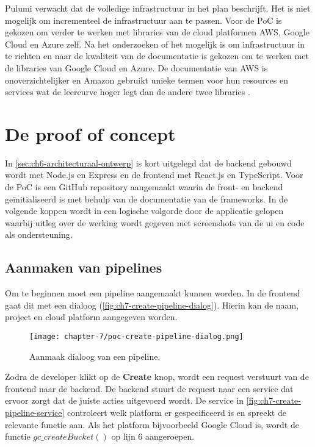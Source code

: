 Pulumi verwacht dat de volledige infrastructuur in het plan beschrijft. Het is niet mogelijk om incrementeel de infrastructuur aan te passen. Voor de PoC is gekozen om verder te werken met libraries van de cloud platformen AWS, Google Cloud en Azure zelf. Na het onderzoeken of het mogelijk is om infrastructuur in te richten en naar de kwaliteit van de documentatie is gekozen om te werken met de libraries van Google Cloud en Azure. De documentatie van AWS is onoverzichtelijker en Amazon gebruikt unieke termen voor hun resources en services wat de leercurve hoger legt dan de andere twee libraries \cite{aws-sdk-javascript-docs}.

\section{De proof of concept}\label{sec:ch7-de-proof-of-concept}
In \autoref{sec:ch6-architecturaal-ontwerp} is kort uitgelegd dat de backend gebouwd wordt met Node.js en Express en de frontend met React.js en TypeScript. Voor de PoC is een GitHub repository aangemaakt waarin de front- en backend geïnitialiseerd is met behulp van de documentatie van de frameworks. In de volgende koppen wordt in een logische volgorde door de applicatie gelopen waarbij uitleg over de werking wordt gegeven met screenshots van de \acrshort{ui} en code als ondersteuning.

\subsection{Aanmaken van pipelines}\label{subsec:ch7-aanmaken-van-pipelines}
Om te beginnen moet een pipeline aangemaakt kunnen worden. In de frontend gaat dit met een dialoog (\autoref{fig:ch7-create-pipeline-dialog}). Hierin kan de naam, project en cloud platform aangegeven worden.

\begin{figure}[hbt!]
  \centering
  \texttt{[image: chapter-7/poc-create-pipeline-dialog.png]}
  \caption{Aanmaak dialoog van een pipeline.}
  \label{fig:ch7-create-pipeline-dialog}
\end{figure}

Zodra de developer klikt op de \textbf{Create} knop, wordt een request verstuurt van de frontend naar de backend. De backend stuurt de request naar een service dat ervoor zorgt dat de juiste acties uitgevoerd wordt. De service in \autoref{fig:ch7-create-pipeline-service} controleert welk platform er gespecificeerd is en spreekt de relevante functie aan. Als het platform bijvoorbeeld Google Cloud is, wordt de functie \(gc\_createBucket()\) op lijn 6 aangeroepen.

